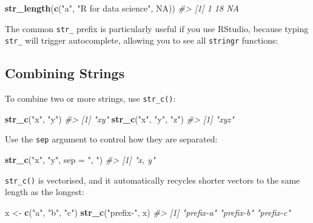 \documentclass[]{book}
\newenvironment{Shaded}{\begin{snugshade}}{\end{snugshade}}
\newcommand{\KeywordTok}[1]{\textcolor[rgb]{0.13,0.29,0.53}{\textbf{#1}}}
\newcommand{\DataTypeTok}[1]{\textcolor[rgb]{0.13,0.29,0.53}{#1}}
\newcommand{\StringTok}[1]{\textcolor[rgb]{0.31,0.60,0.02}{#1}}
\newcommand{\CommentTok}[1]{\textcolor[rgb]{0.56,0.35,0.01}{\textit{#1}}}
\newcommand{\OtherTok}[1]{\textcolor[rgb]{0.56,0.35,0.01}{#1}}
\newcommand{\NormalTok}[1]{#1}
\begin{document}
\begin{Shaded}
\begin{Highlighting}[]
\KeywordTok{str_length}\NormalTok{(}\KeywordTok{c}\NormalTok{(}\StringTok{"a"}\NormalTok{, }\StringTok{"R for data science"}\NormalTok{, }\OtherTok{NA}\NormalTok{))}
\CommentTok{#> [1]  1 18 NA}
\end{Highlighting}
\end{Shaded}

The common \texttt{str\_} prefix is particularly useful if you use
RStudio, because typing \texttt{str\_} will trigger autocomplete,
allowing you to see all \texttt{stringr} functions:

\subsection{Combining Strings}\label{combining-strings}

To combine two or more strings, use \texttt{str\_c()}:

\begin{Shaded}
\begin{Highlighting}[]
\KeywordTok{str_c}\NormalTok{(}\StringTok{"x"}\NormalTok{, }\StringTok{"y"}\NormalTok{)}
\CommentTok{#> [1] "xy"}
\KeywordTok{str_c}\NormalTok{(}\StringTok{"x"}\NormalTok{, }\StringTok{"y"}\NormalTok{, }\StringTok{"z"}\NormalTok{)}
\CommentTok{#> [1] "xyz"}
\end{Highlighting}
\end{Shaded}

Use the \texttt{sep} argument to control how they are separated:

\begin{Shaded}
\begin{Highlighting}[]
\KeywordTok{str_c}\NormalTok{(}\StringTok{"x"}\NormalTok{, }\StringTok{"y"}\NormalTok{, }\DataTypeTok{sep =} \StringTok{", "}\NormalTok{)}
\CommentTok{#> [1] "x, y"}
\end{Highlighting}
\end{Shaded}

\texttt{str\_c()} is vectorised, and it automatically recycles shorter
vectors to the same length as the longest:

\begin{Shaded}
\begin{Highlighting}[]
\NormalTok{x <-}\StringTok{ }\KeywordTok{c}\NormalTok{(}\StringTok{"a"}\NormalTok{, }\StringTok{"b"}\NormalTok{, }\StringTok{"c"}\NormalTok{)}
\KeywordTok{str_c}\NormalTok{(}\StringTok{"prefix-"}\NormalTok{, x)}
\CommentTok{#> [1] "prefix-a" "prefix-b" "prefix-c"}
\end{Highlighting}
\end{Shaded}
\end{document}
